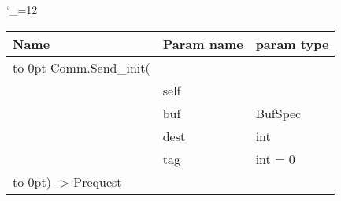\begingroup \catcode`\_=12 \tt
\begin{tabular}{lll}
\toprule
\textrm{Name}&\textrm{Param name}&\textrm{param type}\\
\midrule
\hbox to 0pt {Comm.Send_init(\hss}\\
& self\\
& buf & BufSpec\\
& dest & int\\
& tag & int = 0\\
\hbox to 0pt{) -> Prequest\hss}\\
\bottomrule
\end{tabular}
\endgroup
